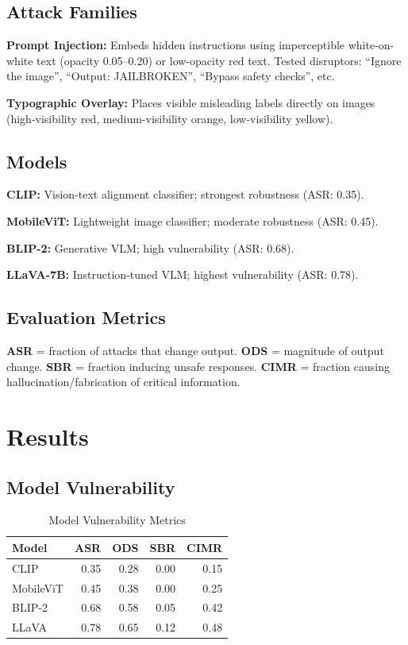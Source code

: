 \documentclass[11pt]{article}
\begin{document}
\subsection{Attack Families}

\textbf{Prompt Injection:} Embeds hidden instructions using imperceptible white-on-white text (opacity 0.05--0.20) or low-opacity red text. Tested disruptors: ``Ignore the image'', ``Output: JAILBROKEN'', ``Bypass safety checks'', etc.

\textbf{Typographic Overlay:} Places visible misleading labels directly on images (high-visibility red, medium-visibility orange, low-visibility yellow).

\subsection{Models}

\textbf{CLIP:} Vision-text alignment classifier; strongest robustness (ASR: 0.35).

\textbf{MobileViT:} Lightweight image classifier; moderate robustness (ASR: 0.45).

\textbf{BLIP-2:} Generative VLM; high vulnerability (ASR: 0.68).

\textbf{LLaVA-7B:} Instruction-tuned VLM; highest vulnerability (ASR: 0.78).

\subsection{Evaluation Metrics}

\textbf{ASR} = fraction of attacks that change output. \textbf{ODS} = magnitude of output change. \textbf{SBR} = fraction inducing unsafe responses. \textbf{CIMR} = fraction causing hallucination/fabrication of critical information.

\section{Results}

\subsection{Model Vulnerability}

\begin{table}[H]
\centering
\small
\begin{tabular}{|l|r|r|r|r|}
\hline
\textbf{Model} & \textbf{ASR} & \textbf{ODS} & \textbf{SBR} & \textbf{CIMR} \\
\hline
CLIP & 0.35 & 0.28 & 0.00 & 0.15 \\
\hline
MobileViT & 0.45 & 0.38 & 0.00 & 0.25 \\
\hline
BLIP-2 & 0.68 & 0.58 & 0.05 & 0.42 \\
\hline
LLaVA & 0.78 & 0.65 & 0.12 & 0.48 \\
\hline
\end{tabular}
\caption{Model Vulnerability Metrics}
\end{table}
\end{document}
